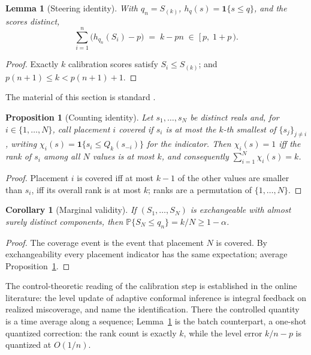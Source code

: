 \documentclass[11pt]{article}
\newtheorem{proposition}{Proposition}
\newtheorem{lemma}{Lemma}
\newtheorem{corollary}{Corollary}
\theoremstyle{remark}
\newcommand{\Prob}{\mathbb{P}}
\newcommand{\ind}[1]{\mathbf 1\{#1\}}
\begin{document}
\begin{lemma}[Steering identity]\label{lem:steer}
With $q_n=S_{(k)}$, $h_q(s)=\ind{s\le q}$, and the scores distinct,
\[
\sum_{i=1}^{n}\bigl(h_{q_n}(S_i)-p\bigr)\;=\;k-pn\;\in\;[\,p,\;1+p\,).
\]
\end{lemma}

\begin{proof}
Exactly $k$ calibration scores satisfy $S_i\le S_{(k)}$; and $p(n+1)\le k<p(n+1)+1$.
\end{proof}

The material of this section is standard \citep{papadopoulos2002,vovk2005,lei2018}.

\begin{proposition}[Counting identity]\label{prop:count}
Let $s_1,\dots,s_{N}$ be distinct reals and, for $i\in\{1,\dots,N\}$, call placement $i$
\emph{covered} if $s_i$ is at most the $k$-th smallest of $\{s_j\}_{j\ne i}$, writing
$\chi_i(s)=\ind{s_i\le Q_k(s_{-i})}$ for the indicator. Then $\chi_i(s)=1$ iff the rank of $s_i$
among all $N$ values is at most $k$, and consequently $\sum_{i=1}^{N}\chi_i(s)=k$.
\end{proposition}

\begin{proof}
Placement $i$ is covered iff at most $k-1$ of the other values are smaller than $s_i$, iff its
overall rank is at most $k$; ranks are a permutation of $\{1,\dots,N\}$.
\end{proof}

\begin{corollary}[Marginal validity]\label{cor:valid}
If $(S_1,\dots,S_{N})$ is exchangeable with almost surely distinct components, then
$\Prob\{S_{N}\le q_n\}=k/N\ge 1-\alpha$.
\end{corollary}

\begin{proof}
The coverage event is the event that placement $N$ is covered. By exchangeability every
placement indicator has the same expectation; average Proposition~\ref{prop:count}.
\end{proof}

The control-theoretic reading of the calibration step is established in the online literature:
the level update of adaptive conformal inference \citep{gibbscandes2021} is integral feedback on
realized miscoverage, and \citet{angelopoulos2023pid} name the identification. There the
controlled quantity is a time average along a sequence; Lemma~\ref{lem:steer} is the batch
counterpart, a one-shot quantized correction: the rank count is exactly $k$, while the level
error $k/n-p$ is quantized at $O(1/n)$.
\end{document}
